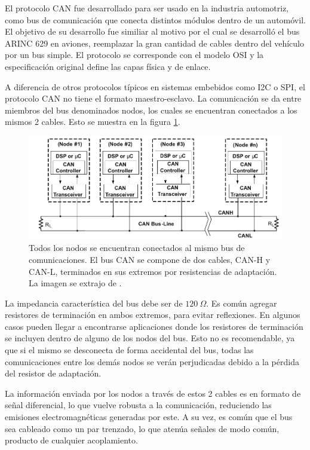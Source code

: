 El protocolo CAN fue desarrollado para ser usado en la industria automotriz, como bus de comunicación que conecta distintos módulos dentro de un automóvil. El objetivo de su desarrollo fue similiar al motivo por el cual se desarrolló el bus ARINC 629 en aviones, reemplazar la gran cantidad de cables dentro del vehículo por un bus simple. El protocolo se corresponde con el modelo OSI y la especificación original define las capas física y de enlace.

A diferencia de otros protocolos típicos en sistemas embebidos como I2C o SPI, el protocolo CAN no tiene el formato maestro-esclavo. La comunicación se da entre miembros del bus denominados nodos, los cuales se encuentran conectados a los mismos 2 cables. Esto se muestra en la figura \ref{fig:red_CAN_2}. 

\begin{figure}[H]
    \centering
    \includegraphics[width=\textwidth]{img/red_CAN.png}
    \caption{Todos los nodos se encuentran conectados al mismo bus de comunicaciones. El bus CAN se compone de dos cables, CAN-H y CAN-L, terminados en sus extremos por resistencias de adaptación. La imagen se extrajo de \cite{texasSLOA101B}.}
    \label{fig:red_CAN_2}
\end{figure}

La impedancia característica del bus debe ser de $120 \ \Omega$. Es común agregar resistores de terminación en ambos extremos, para evitar reflexiones. En algunos casos pueden llegar a encontrarse aplicaciones donde los resistores de terminación se incluyen dentro de alguno de los nodos del bus. Esto no es recomendable, ya que si el mismo se desconecta de forma accidental del bus, todas las comunicaciones entre los demás nodos se verán perjudicadas debido a la pérdida del resistor de adaptación.

La información enviada por los nodos a través de estos 2 cables es en formato de señal diferencial, lo que vuelve robusta a la comunicación, reduciendo las emisiones electromagnéticas generadas por este. A su vez, es común que el bus sea cableado como un par trenzado, lo que atenúa señales de modo común, producto de cualquier acoplamiento.

